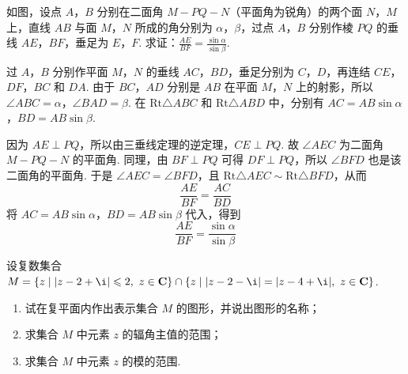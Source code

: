 \documentclass[UTF8,a4paper,oneside,11pt]{ctexbook}
\begin{document}
\begin{problem}
如图，设点 \(A\)，\(B\) 分别在二面角 \(M-PQ-N\)（平面角为锐角）的两个面 \(N\)，\(M\) 上，直线 \(AB\) 与面 \(M\)，\(N\) 所成的角分别为 \(\alpha\)，\(\beta\)，过点 \(A\)，\(B\) 分别作棱 \(PQ\) 的垂线 \(AE\)，\(BF\)，垂足为 \(E\)，\(F\). 求证：\(\frac{AE}{BF}=\frac{\sin \alpha}{\sin \beta}\).

\end{problem}

\begin{solution}
过 \(A\)，\(B\) 分别作平面 \(M\)，\(N\) 的垂线 \(AC\)，\(BD\)，垂足分别为 \(C\)，\(D\)，再连结 \(CE\)，\(DF\)，\(BC\) 和 \(DA\). 由于 \(BC\)，\(AD\) 分别是 \(AB\) 在平面 \(M\)，\(N\) 上的射影，所以 \(\angle ABC=\alpha\)，\(\angle BAD=\beta\). 在 \(\mathrm{Rt}\triangle ABC\) 和 \(\mathrm{Rt}\triangle ABD\) 中，分别有 \(AC=AB\sin\alpha\)，\(BD=AB\sin\beta\).


因为 \(AE\perp PQ\)，所以由三垂线定理的逆定理，\(CE\perp PQ\). 故 \(\angle AEC\) 为二面角 \(M-PQ-N\) 的平面角. 同理，由 \(BF\perp PQ\) 可得 \(DF\perp PQ\)，所以 \(\angle BFD\) 也是该二面角的平面角. 于是 \(\angle AEC=\angle BFD\)，且 \(\mathrm{Rt}\triangle AEC\sim \mathrm{Rt}\triangle BFD\)，从而
\[
\frac{AE}{BF}=\frac{AC}{BD}
\]
将 \(AC=AB\sin\alpha\)，\(BD=AB\sin\beta\) 代入，得到
\[
\frac{AE}{BF}=\frac{\sin\alpha}{\sin\beta}
\]
\end{solution}

\begin{problem}
设复数集合 \(M=\left\{z\mid |z-2+\i|\leqslant 2,\ z\in \mathbf{C}\right\}\cap \left\{z\mid |z-2-\i|=|z-4+\i|,\ z\in \mathbf{C}\right\}\).
\begin{enumerate}
\item 试在复平面内作出表示集合 \(M\) 的图形，并说出图形的名称；
\item 求集合 \(M\) 中元素 \(z\) 的辐角主值的范围；
\item 求集合 \(M\) 中元素 \(z\) 的模的范围.
\end{enumerate}
\end{problem}
\end{document}
